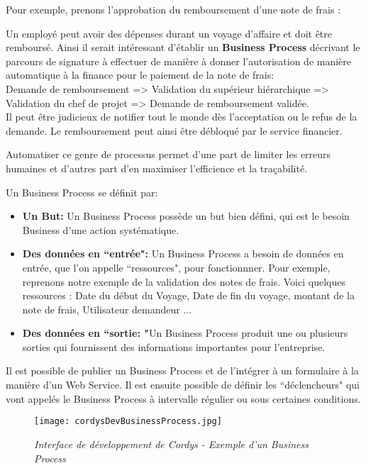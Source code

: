 Pour exemple, prenons l'approbation du remboursement d'une note de frais :

Un employé peut avoir des dépenses durant un voyage d'affaire et doit être remboursé. Ainsi il serait intéressant d'établir un \textbf{Business Process} décrivant le parcours de signature à effectuer de manière à donner l'autorisation de manière automatique à la finance pour le paiement de la note de frais:\\
Demande de remboursement => Validation du supérieur hiérarchique => Validation du chef de projet => Demande de remboursement validée. \\
Il peut être judicieux de notifier tout le monde dès l'acceptation ou le refus de la demande. Le remboursement peut ainsi être débloqué par le service financier.

Automatiser ce genre de processus permet d'une part de limiter les erreurs humaines et d'autres part d'en maximiser l'efficience et la traçabilité.

Un Business Process se définit par:

\begin{itemize}\itemsep7pt

	\item \textbf{Un But: } Un Business Process possède un but bien défini, qui est le besoin Business d'une action systématique.
	
	\item \textbf{Des données en ``entrée": }Un Business Process a besoin de données en entrée, que l'on appelle ``ressources", pour fonctionnner. Pour exemple, reprenons notre exemple de la validation des notes de frais. Voici quelques ressources : Date du début du Voyage, Date de fin du voyage, montant de la note de frais, Utilisateur demandeur ...
	
	\item \textbf{Des données en ``sortie: "}Un Business Process produit une ou plusieurs sorties qui fournissent des informations importantes pour l'entreprise.
	
\end{itemize}

Il est possible de publier un Business Process et de l'intégrer à un formulaire à la manière d'un Web Service. Il est ensuite possible de définir les ``déclencheurs" qui vont appelés le Business Process à intervalle régulier ou sous certaines conditions.

\begin{figure}[H]
    \centering
    \texttt{[image: cordysDevBusinessProcess.jpg]}
	\caption{\textit{Interface de développement de Cordys - Exemple d'un Business Process}}\label{image.cordysDevFormsDef2} 
\end{figure}
\clearpage

